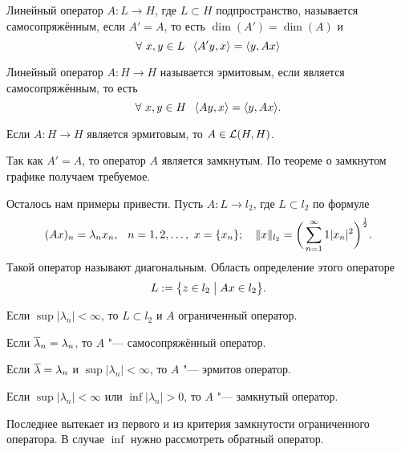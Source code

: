 \begin{Def}
  Линейный оператор $A\colon L\to H$, где $L\subset H$ подпространство, называется самосопряжённым, если $A'=A$, то есть $\dim(A') = \dim(A)$ и 
\[
  \forall\ x,y\in L\pau   \la A'y,x\ra = \la y,Ax\ra
\]
\end{Def}
\begin{Def}
  Линейный оператор $A\colon H\to H$ называется эрмитовым, если является самосопряжённым, то есть 
\[
  \forall\ x,y\in H\pau \la Ay,x\ra = \la y,Ax\ra.
\]
\end{Def}
\begin{The}
  Если $A\colon H\to H$ является эрмитовым, то $A\in \mathcal L(H,H)$.
\end{The}
\begin{Proof}
  Так как $A'=A$, то оператор $A$ является замкнутым. По теореме о замкнутом графике получаем требуемое.
\end{Proof}

Осталось нам примеры привести. Пусть $A\colon L\to l_2$, где $L\subset l_2$ по формуле
\[
  (Ax)_n = \lambda_nx_n,\hskip .75em plus.1em minus.08em\relax n=1,2,\dots,\ x = \{x_n\};\quad \|x\|_{l_2} = \bigg(\sum\limits_{{n}={1}}^\infty1|x_n|^2\bigg)^{\frac{1}{2}}.
\]
Такой оператор называют диагональным. Область определение этого операторе
\[
  L:=\big\{ z\in l_2\bigm| Ax\in l_2 \big\}.
\]
\begin{Exa}
  Если $\sup |\lambda_n|<\infty$, то $L\subset l_2$ и $A$ ограниченный оператор.
\end{Exa}
\begin{Exa}
  Если $\overline{\lambda}_n = \lambda_n$, то $A$ "--- самосопряжённый оператор.
\end{Exa}
\begin{Exa}
  Если $\overline{\lambda} = \lambda_n$ и $\sup|\lambda_n|<\infty$, то $A$ "--- эрмитов оператор.
\end{Exa}
\begin{Exa}
  Если $\sup|\lambda_n|<\infty$ или $\inf|\lambda_n|>0$, то $A$ "--- замкнутый оператор.
\end{Exa}
Последнее вытекает из первого и из критерия замкнутости ограниченного оператора. В случае $\inf$ нужно рассмотреть обратный оператор.
